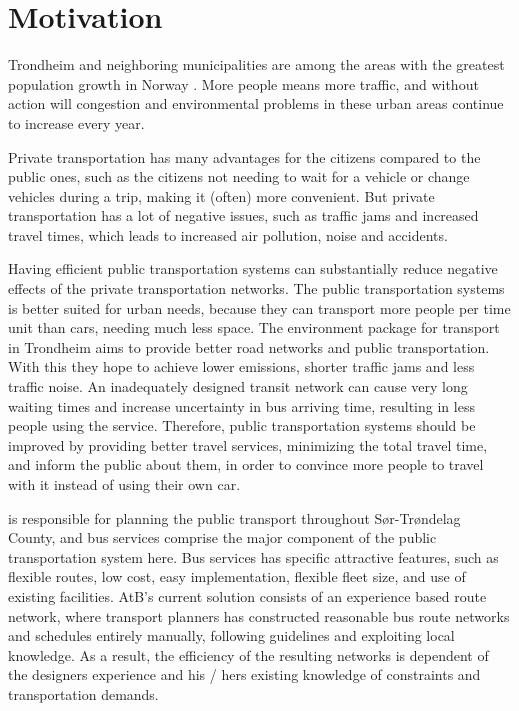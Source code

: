 \section{Motivation} 
\label{sec:motivation}

Trondheim and neighboring municipalities are among the areas with the greatest population growth in Norway \citep{website:miljopakken}. More people means more traffic, and without action will congestion and environmental problems in these urban areas continue to increase every year.\par
Private transportation has many advantages for the citizens compared to the public ones, such as the citizens not needing to wait for a vehicle or change vehicles during a trip, making it (often) more convenient. But private transportation has a lot of negative issues, such as traffic jams and increased travel times, which leads to increased air pollution, noise and accidents. 

Having efficient public transportation systems can substantially reduce negative effects of the private transportation networks. The public transportation systems is better suited for urban needs, because they can transport more people per time unit than cars, needing much less space. The environment package \citep{website:miljopakken} for transport in Trondheim aims to provide better road networks and public transportation. With this they hope to achieve lower emissions, shorter traffic jams and less traffic noise. An inadequately designed transit network can cause very long waiting times and increase uncertainty in bus arriving time, resulting in less people using the service. Therefore, public transportation systems should be improved by providing better travel services, minimizing the total travel time, and inform the public about them, in order to convince more people to travel with it instead of using their own car.

\citet{website:atb} is responsible for planning the public transport throughout Sør-Trøndelag County, and bus services comprise the major component of the public transportation system here. Bus services has specific attractive features, such as flexible routes, low cost, easy implementation, flexible fleet size, and use of existing facilities. 
AtB's current solution consists of an experience based route network, where transport planners has constructed reasonable bus route networks and schedules entirely manually, following guidelines and exploiting local knowledge. As a result, the efficiency of the resulting networks is dependent of the designers experience and his / hers existing knowledge of constraints and transportation demands.

